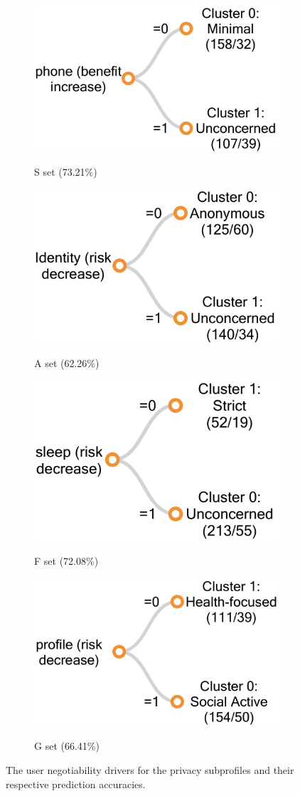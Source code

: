 \begin{figure}
	\centering
	\begin{subfigure}[b]{0.4\linewidth}
		\includegraphics[width=0.5\linewidth]{figures/s_tree4new.png}
		\label{fig:stree4}
		\caption{S set (73.21\%)}
	\end{subfigure}
	\begin{subfigure}[b]{0.4\linewidth}  
		\includegraphics[width=0.5\linewidth]{figures/a_tree4new.png}
		\label{fig:atree4}
		\caption{A set (62.26\%)}
	\end{subfigure}
	\begin{subfigure}[b]{0.4\linewidth} 
		\includegraphics[width=0.5\linewidth]{figures/f_tree4new.png}
		\label{fig:ftree4}
		\caption{F set (72.08\%)}
	\end{subfigure} 
	\begin{subfigure}[b]{0.4\linewidth} 
		\includegraphics[width=0.5\linewidth]{figures/g_tree4new.png}
		\label{fig:gtree4}
		\caption{G set (66.41\%)}
	\end{subfigure}
	\caption{The user negotiability drivers for the privacy subprofiles and their respective prediction accuracies.}
	\label{fig:tree4}
\end{figure}

